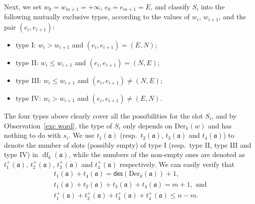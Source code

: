 \documentclass[12pt]{amsart} %
\numberwithin{equation}{section}
\theoremstyle{plain}
\theoremstyle{definition}
\def\Der{\mathrm{Der}}
\def\des{\mathsf{des}}
\def\a{\mathfrak{a}}
\def\df{\operatorname{df}}
\begin{document}
Next, we set $w_0=w_{m+1}=+\infty$, $e_0=e_{m+1}=E$, and classify $S_i$ into the following mutually exclusive types, according to the values of $w_i$, $w_{i+1}$, and the pair $(e_i,e_{i+1})$:
\begin{itemize}
	\item type I: $w_{i} > w_{i+1}$ and $(e_i,e_{i+1})=(E,N)$;
	\item type II: $w_{i} \le w_{i+1}$ and $(e_i,e_{i+1})=(N,E)$;
	\item type III: $w_{i} \le w_{i+1}$ and $(e_i,e_{i+1})\not=(N,E)$;
	\item type IV: $w_{i} > w_{i+1}$ and $(e_i,e_{i+1})\not=(E,N)$.
\end{itemize}

The four types above clearly cover all the possibilities for the slot $S_i$, and by Observation~\ref{exc word}, the type of $S_i$ only depends on $\Der_k(w)$ and has nothing to do with $s_i$. We use $t_1(\a)$ (resp.~$t_2(\a)$, $t_3(\a)$ and $t_4(\a)$) to denote the number of slots (possibly empty) of type I (resp.~type II, type III and type IV) in $\df_k(\a)$, while the numbers of the non-empty ones are denoted as $t_1^{+}(\a)$, $t_2^{+}(\a)$, $t_3^{+}(\a)$ and $t_4^{+}(\a)$ respectively. We can easily verify that
\begin{align*}
&t_1(\a)+t_4(\a) = \des(\Der_k(\a))+1,\\
&t_1(\a)+t_2(\a)+t_3(\a)+t_4(\a) = m+1, \text{ and }\\
&t_1^+(\a)+t_2^+(\a)+t_3^+(\a)+t_4^+(\a) \le n-m.
\end{align*}
\end{document}
